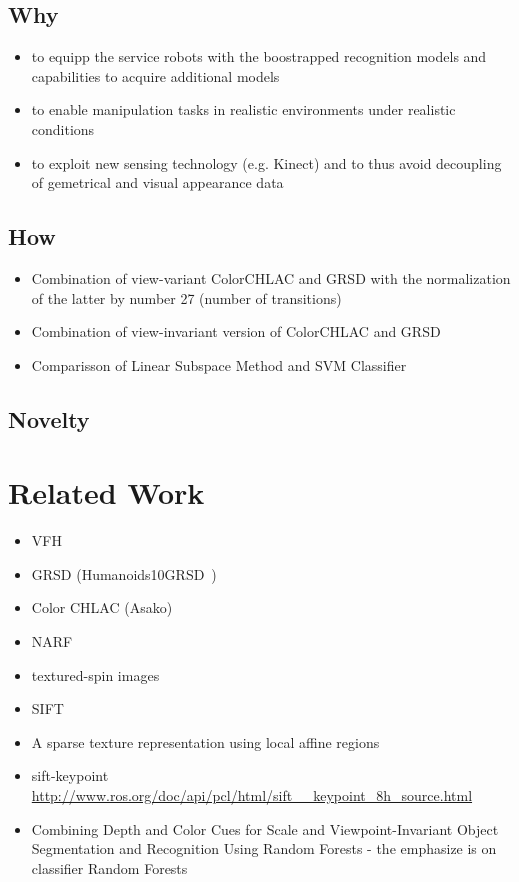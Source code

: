 \documentclass[conference]{sty/IEEEtran}
\begin{document}
\subsection{Why}
\begin{itemize}
\item to equipp the service robots with the boostrapped recognition models and capabilities
to acquire additional models
\item to enable manipulation tasks in realistic environments under realistic conditions
\item to exploit new sensing technology (e.g. Kinect) and to thus avoid decoupling of gemetrical and
visual appearance data
\end{itemize}


\subsection{How}
\begin{itemize}
\item Combination of view-variant ColorCHLAC and GRSD with the
normalization of the latter by number 27 (number of transitions)
\item Combination of view-invariant version of ColorCHLAC and GRSD
\item Comparisson of Linear Subspace Method and SVM Classifier
\end{itemize}

\subsection{Novelty}


\section{Related Work}
\begin{itemize}
\item VFH~\cite{vfh}
\item GRSD (Humanoids10GRSD~)\cite{GRSD10Humanoids}
\item Color CHLAC (Asako)~\cite{kanezaki2010icra}\cite{kanezaki2010tvc}
\item NARF~\cite{steder10irosws}
\item textured-spin images~\cite{Johnson_spin_images}
\item SIFT~\cite{Lowe04distinctive}
\item A sparse texture representation using local affine regions~\cite{Lazebnik05asparse}
\item sift-keypoint \url{http://www.ros.org/doc/api/pcl/html/sift__keypoint_8h_source.html}
\item Combining Depth and Color Cues for Scale and Viewpoint-Invariant
Object Segmentation and Recognition Using Random Forests - the emphasize is on classifier Random Forests~\cite{stueckler10combining}
\end{itemize}
\end{document}
